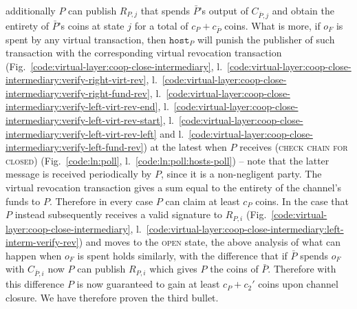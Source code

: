   additionally $P$ can publish $R_{P, j}$ that spends $\bar{P}$'s output of
  $C_{\bar{P}, j}$ and obtain the entirety of $\bar{P}$'s coins at state $j$ for
  a total of $c_P + c_{\bar{P}}$ coins. What is more, if $o_F$ is spent by any
  virtual transaction, then $\texttt{host}_P$ will punish the publisher of such
  transaction with the corresponding virtual revocation transaction
  (Fig.~\ref{code:virtual-layer:coop-close-intermediary},
  l.~\ref{code:virtual-layer:coop-close-intermediary:verify-right-virt-rev},
  l.~\ref{code:virtual-layer:coop-close-intermediary:verify-right-fund-rev},
  l.~\ref{code:virtual-layer:coop-close-intermediary:verify-left-virt-rev-end},
  l.~\ref{code:virtual-layer:coop-close-intermediary:verify-left-virt-rev-start},
  l.~\ref{code:virtual-layer:coop-close-intermediary:verify-left-virt-rev-left}
  and l.~\ref{code:virtual-layer:coop-close-intermediary:verify-left-fund-rev})
  at the latest when $P$ receives (\textsc{check chain for closed})
  (Fig.~\ref{code:ln:poll}, l.~\ref{code:ln:poll:hosts-poll}) -- note that the
  latter message is received periodically by $P$, since it is a non-negligent
  party. The virtual revocation transaction gives a sum equal to the entirety of
  the channel's funds to $P$. Therefore in every case $P$ can claim at least
  $c_P$ coins. In the case that $P$ instead
  subsequently receives a valid signature to $R_{P, i}$
  (Fig.~\ref{code:virtual-layer:coop-close-intermediary},
  l.~\ref{code:virtual-layer:coop-close-intermediary:left-interm-verify-rev})
  and moves to the \textsc{open} state, the above analysis of what can happen
  when $o_F$ is spent holds similarly, with the difference that if $\bar{P}$
  spends $o_F$ with $C_{\bar{P}, i}$ now $P$ can publish $R_{P, i}$ which gives
  $P$ the coins of $\bar{P}$. Therefore with this difference $P$ is now
  guaranteed to gain at least $c_P + c_2'$ coins upon channel closure. We have
  therefore proven the third bullet.

